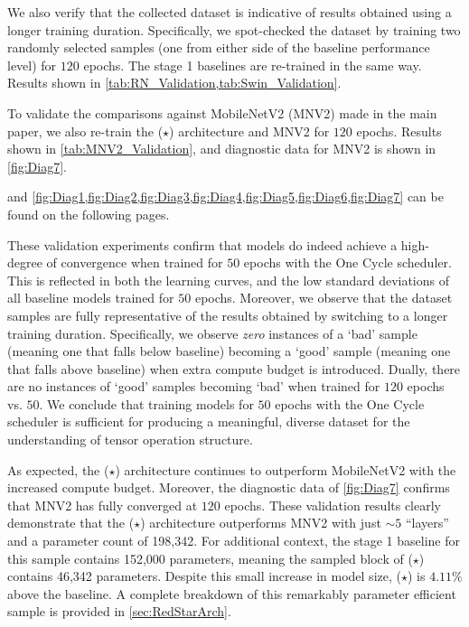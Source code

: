 \documentclass{article}
\theoremstyle{plain}
\theoremstyle{definition}
\theoremstyle{remark}
\begin{document}
We also verify that the collected dataset is indicative of results obtained using a longer training duration. Specifically, we spot-checked the dataset by training two randomly selected samples (one from either side of the baseline performance level) for $120$ epochs. The stage 1 baselines are re-trained in the same way. Results shown in \cref{tab:RN_Validation,tab:Swin_Validation}.

To validate the comparisons against MobileNetV2 (MNV2) made in the main paper, we also re-train the ({\color{red}$\bm{\star}$}) architecture and MNV2 for $120$ epochs. Results shown in \cref{tab:MNV2_Validation}, and diagnostic data for MNV2 is shown in \cref{fig:Diag7}.

 and \cref{fig:Diag1,fig:Diag2,fig:Diag3,fig:Diag4,fig:Diag5,fig:Diag6,fig:Diag7} can be found on the following pages.

These validation experiments confirm that models do indeed achieve a high-degree of convergence when trained for $50$ epochs with the One Cycle scheduler. This is reflected in both the learning curves, and the low standard deviations of all baseline models trained for $50$ epochs. Moreover, we observe that the dataset samples are fully representative of the results obtained by switching to a longer training duration. Specifically, we observe \textit{zero} instances of a `bad' sample (meaning one that falls below baseline) becoming a `good' sample (meaning one that falls above baseline) when extra compute budget is introduced. Dually, there are no instances of `good' samples becoming `bad' when trained for $120$ epochs vs. $50$. We conclude that training models for $50$ epochs with the One Cycle scheduler is sufficient for producing a meaningful, diverse dataset for the understanding of tensor operation structure.

As expected, the ({\color{red}$\bm{\star}$}) architecture continues to outperform MobileNetV2 with the increased compute budget. Moreover, the diagnostic data of \cref{fig:Diag7} confirms that MNV2 has fully converged at $120$ epochs. These validation results clearly demonstrate that the ({\color{red}$\bm{\star}$}) architecture outperforms MNV2 with just $\sim5$ ``layers'' and a parameter count of 198,342. For additional context, the stage 1 baseline for this sample contains 152,000 parameters, meaning the sampled block of ({\color{red}$\bm{\star}$}) contains 46,342 parameters. Despite this small increase in model size, ({\color{red}$\bm{\star}$}) is $4.11\%$ above the baseline. A complete breakdown of this remarkably parameter efficient sample is provided in \cref{sec:RedStarArch}.
\end{document}
